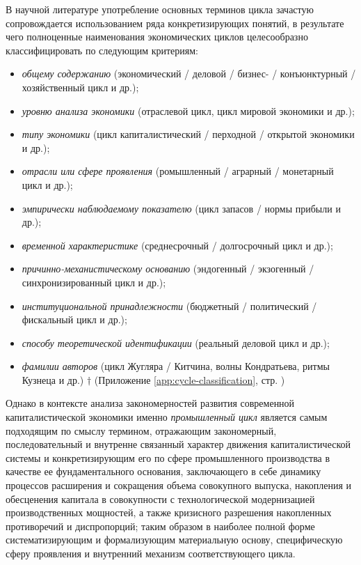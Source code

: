 В научной литературе употребление основных терминов цикла зачастую сопровождается использованием ряда конкретизирующих понятий, в результате чего полноценные наименования экономических циклов целесообразно классифицировать по следующим критериям:
\begin{itemize}
    \item \textit{общему содержанию} (экономический / деловой / бизнес- / конъюнктурный / хозяйственный цикл и др.);
    \item \textit{уровню анализа экономики} (отраслевой цикл, цикл мировой экономики и др.);
    \item \textit{типу экономики} (цикл капиталистический / перходной / открытой экономики и др.);
    \item \textit{отрасли или сфере проявления} (ромышленный / аграрный / монетарный цикл и др.);
    \item \textit{эмпирически наблюдаемому показателю} (цикл запасов / нормы прибыли и др.);
    \item \textit{временной характеристике} (среднесрочный / долгосрочный цикл и др.);
    \item \textit{причинно-механистическому основанию} (эндогенный / экзогенный / синхронизированный цикл и др.);
    \item \textit{институциональной принадлежности} (бюджетный / политический / фискальный цикл и др.);
    \item \textit{способу теоретической идентификации} (реальный деловой цикл и др.);
    \item \textit{фамилии авторов} (цикл Жугляра / Китчина, волны Кондратьева, ритмы Кузнеца и др.) $\dagger$ (Приложение \ref{app:cycle-classification}, стр. \pageref{tab:cycle-classification-general})
\end{itemize}

Однако в контексте анализа закономерностей развития современной капиталистической экономики именно \textit{промышленный цикл} является самым подходящим по смыслу термином, отражающим закономерный, последовательный и внутренне связанный характер движения капиталистической системы и конкретизирующим его по сфере промышленного производства в качестве ее фундаментального основания, заключающего в себе динамику процессов расширения и сокращения объема совокупного выпуска, накопления и обесценения капитала в совокупности с технологической модернизацией производственных мощностей, а также кризисного разрешения накопленных противоречий и диспропорций; таким образом в наиболее полной форме систематизирующим и формализующим материальную основу, специфическую сферу проявления и внутренний механизм соответствующего цикла.

